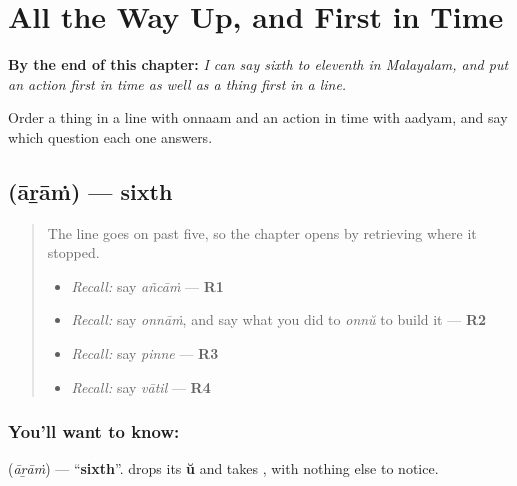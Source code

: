 
\chapter{All the Way Up, and First in Time}
\label{ch:ml-ordinals-to-eleventh}

\begin{chapteropening}
\textbf{By the end of this chapter:} \emph{I can say sixth to eleventh in Malayalam, and put an action first in time as well as a thing first in a line.}

Order a thing in a line with onnaam and an action in time with aadyam, and say which question each one answers.
\end{chapteropening}

\section[\texorpdfstring{\ml{ആറാം} (āṟāṁ)}{ആറാം (āṟāṁ)}]{ (āṟāṁ) — sixth}

\label{lesson:ML-C68-sixth}



\begin{quote}
The line goes on past five, so the chapter opens by retrieving where it stopped.

\begin{itemize}
\raggedright
  \item \emph{Recall:} say \emph{añcāṁ} — \textbf{R1}
  \item \emph{Recall:} say \emph{onnāṁ}, and say what you did to \emph{onnŭ} to build it — \textbf{R2}
  \item \emph{Recall:} say \emph{pinne} — \textbf{R3}
  \item \emph{Recall:} say \emph{vātil} — \textbf{R4}
\end{itemize}
\end{quote}

\subsection*{You'll want to know: }
\textbf{} (\emph{āṟāṁ}) — \textquotedblleft{}\textbf{sixth}\textquotedblright{}. \textbf{} drops its \textbf{ŭ} and takes \textbf{}, with nothing else to notice.

